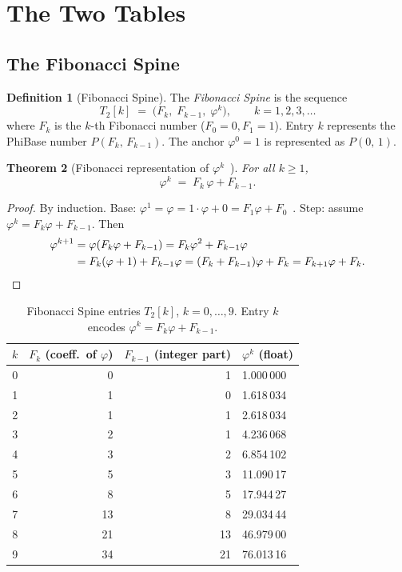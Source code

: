 \documentclass[12pt]{article}
\newtheorem{theorem}{Theorem}[section]
\theoremstyle{definition}
\newtheorem{definition}[theorem]{Definition}
\theoremstyle{remark}
\newcommand{\Phib}[2]{P(#1,\,#2)}
\begin{document}
\section{The Two Tables}
\subsection{The Fibonacci Spine}
\label{sec:spine}
\begin{definition}[Fibonacci Spine]
The \emph{Fibonacci Spine} is the sequence
\[
  T_2[k] \;=\; \bigl(F_k,\; F_{k-1},\; \varphi^k\bigr),
  \qquad k = 1,2,3,\ldots
\]
where $F_k$ is the $k$-th Fibonacci number ($F_0=0,F_1=1$).
Entry $k$ represents the PhiBase number $\Phib{F_k}{F_{k-1}}$.
The anchor $\varphi^0 = 1$ is represented as $\Phib{0}{1}$.
\end{definition}
\begin{theorem}[Fibonacci representation of $\varphi^k$~\cite{vajda,koshy}]
\label{thm:fibpow}
For all $k\geq 1$,
\[
  \varphi^k \;=\; F_k\,\varphi + F_{k-1}.
\]
\end{theorem}
\begin{proof}
By induction.  Base: $\varphi^1 = \varphi = 1\cdot\varphi+0 =
F_1\varphi+F_0$~\checkmark.  Step: assume $\varphi^k = F_k\varphi+F_{k-1}$.
Then
\begin{align*}
  \varphi^{k+1}
  &= \varphi(F_k\varphi+F_{k-1})
   = F_k\varphi^2+F_{k-1}\varphi \\
  &= F_k(\varphi+1)+F_{k-1}\varphi
   = (F_k+F_{k-1})\varphi+F_k
   = F_{k+1}\varphi+F_k. \qedhere
\end{align*}
\end{proof}
\begin{table}[h]
\centering
\caption{Fibonacci Spine entries $T_2[k]$, $k=0,\ldots,9$.
  Entry $k$ encodes $\varphi^k = F_k\varphi+F_{k-1}$.}
\label{tab:spine}
\begin{tabular}{rrrl}
\toprule
$k$ & $F_k$ (coeff.\ of $\varphi$) & $F_{k-1}$ (integer part) & $\varphi^k$ (float) \\
\midrule
0 & 0 & 1 & 1.000\,000 \\
1 & 1 & 0 & 1.618\,034 \\
2 & 1 & 1 & 2.618\,034 \\
3 & 2 & 1 & 4.236\,068 \\
4 & 3 & 2 & 6.854\,102 \\
5 & 5 & 3 & 11.090\,17 \\
6 & 8 & 5 & 17.944\,27 \\
7 & 13& 8 & 29.034\,44 \\
8 & 21& 13& 46.979\,00 \\
9 & 34& 21& 76.013\,16 \\
\bottomrule
\end{tabular}
\end{table}
\end{document}
